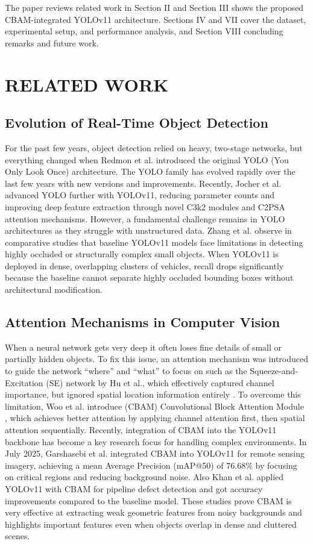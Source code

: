 \documentclass[sigconf]{acmart}
\begin{document}
The paper reviews related work in Section II and Section III shows the proposed CBAM-integrated YOLOv11 architecture. Sections IV and VII cover the dataset, experimental setup, and performance analysis, and  Section VIII concluding remarks and future work.

\section{RELATED WORK}

\subsection{Evolution of Real-Time Object Detection}

For the past few years, object detection relied on heavy, two-stage networks, but everything changed when Redmon et al. introduced the original YOLO (You Only Look Once) architecture\cite{redmon2016you}. The YOLO family has evolved rapidly over the last few years with new versions and improvements. Recently, Jocher et al. advanced YOLO further with YOLOv11, reducing parameter counts\cite{Jocher2025YOLOv11} and improving deep feature extraction through novel C3k2 modules and C2PSA attention mechanisms\cite{9a}. However, a fundamental challenge remains in YOLO architectures as they struggle with unstructured data. Zhang et al. observe in comparative studies that baseline YOLOv11 models face limitations in detecting highly occluded or structurally complex small objects\cite{zhang2025trinext}. When YOLOv11 is deployed in dense, overlapping clusters of vehicles, recall drops significantly because the baseline cannot separate highly occluded bounding boxes without architectural modification.

\subsection{Attention Mechanisms in Computer Vision}
When a neural network gets very deep it often loses fine details of small or partially hidden objects. To fix this issue, an attention mechanism was introduced to guide the network “where” and “what” to focus on such as the Squeeze-and-Excitation (SE) network by Hu et al., which effectively captured channel importance, but ignored spatial location information entirely \cite{11a}. To overcome this limitation, Woo et al. introduce (CBAM) Convolutional Block Attention Module \cite{Woo2018CBAM}, which achieves better attention by applying channel attention first, then spatial attention sequentially. Recently, integration of CBAM into the YOLOv11 backbone has become a key research focus for handling complex environments. In July 2025, Garshasebi et al.\cite{garshasebi2025improving} integrated CBAM into YOLOv11 for remote sensing imagery, achieving a mean Average Precision (mAP@50) of 76.68\% by focusing on critical regions and reducing background noise. Also Khan et al. applied YOLOv11 with CBAM for pipeline defect detection and got accuracy improvements compared to the baseline model\cite{khan2025pipeline}. These studies prove CBAM is very effective at extracting weak geometric features from noisy backgrounds and highlights important features even when objects overlap in dense and cluttered scenes.
\end{document}
